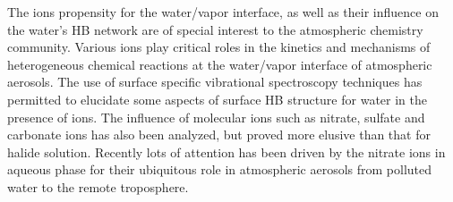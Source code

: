 The ions propensity for the water/vapor interface, as well as their influence on  
the water's HB network are of special interest to the atmospheric chemistry 
community.\cite{FPBJ,BJ} Various ions play critical roles in the kinetics 
and mechanisms of heterogeneous chemical reactions at the water/vapor interface of atmospheric aerosols. 
The use of surface specific vibrational spectroscopy techniques has 
permitted to elucidate some aspects of surface HB structure for water in 
the presence of ions.\cite{AJ12,AGL05} The influence of molecular ions such as nitrate­, sulfate­ and 
carbonate ions­ has also been analyzed, but proved more elusive than that for halide solution\cite{SG05,PS03}.
Recently lots of attention has been driven by the nitrate ions in aqueous phase for their 
ubiquitous role in atmospheric aerosols from polluted water to the remote troposphere.
\cite{BJ}



